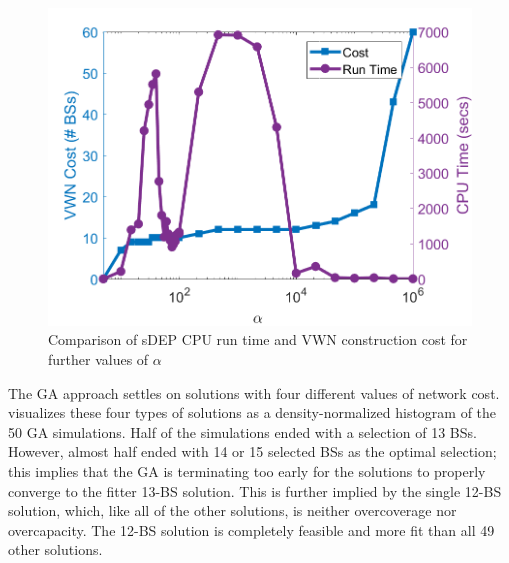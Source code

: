 \documentclass[12pt,dvipsnames]{report}
\begin{document}
\begin{figure}[htp]
	\centering
	\includegraphics[height=0.4\textheight]{Figures/Prelim_O25sDEPComparisonCostRunTimeExpandedAlpha}
	\caption[Expanded comparison of the preliminary simulations sDEP run time and cost]{Comparison of sDEP CPU run time and VWN construction cost for further values of $\alpha$}
	\label{fig:Prelim_sDEPCompCostRunTimeExpanded}
\end{figure}

The GA approach settles on solutions with four different values of network cost.   visualizes these four types of solutions as a density-normalized histogram of the 50 GA simulations.  Half of the simulations ended with a selection of 13 BSs.  However, almost half ended with 14 or 15 selected BSs as the optimal selection; this implies that the GA is terminating too early for the solutions to properly converge to the fitter 13-BS solution.  This is further implied by the single 12-BS solution, which, like all of the other solutions, is neither overcoverage nor overcapacity.  The 12-BS solution is completely feasible and more fit than all 49 other solutions.
\end{document}

